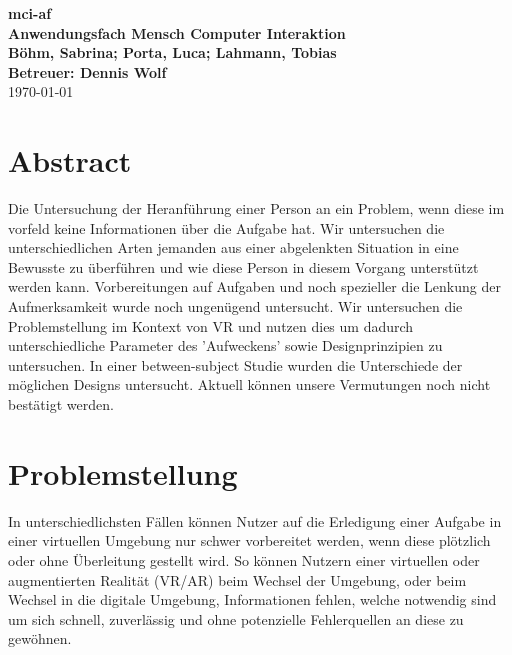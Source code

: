 \documentclass[a4paper, 11pt]{article}
\newcommand{\projectName}{mci-af}
\begin{document}
\begin{center}
	\textbf{\LARGE{\projectName}}\\
    \textbf{\large{Anwendungsfach Mensch Computer Interaktion}}\\
	\vspace{7mm}
    \textbf{\large{Böhm, \textbf{Sabrina}; Porta, Luca; Lahmann, Tobias}}\\
	\textbf{\large{Betreuer: Dennis Wolf}}\\
	\today
\end{center}

\section*{Abstract}
Die Untersuchung der Heranführung einer Person an ein Problem, wenn diese im vorfeld keine Informationen über die Aufgabe hat. %
Wir untersuchen die unterschiedlichen Arten jemanden aus einer abgelenkten Situation in eine Bewusste zu überführen und wie diese Person in diesem Vorgang unterstützt werden kann. %
Vorbereitungen auf Aufgaben und noch spezieller die Lenkung der Aufmerksamkeit wurde noch ungenügend untersucht. %
Wir untersuchen die Problemstellung im Kontext von VR und nutzen dies um dadurch unterschiedliche Parameter des 'Aufweckens' sowie Designprinzipien zu untersuchen. %
In einer between-subject Studie wurden die Unterschiede der möglichen Designs untersucht. %
Aktuell können unsere Vermutungen noch nicht bestätigt werden. %

\section*{Problemstellung}
In unterschiedlichsten Fällen können Nutzer auf die Erledigung einer Aufgabe in einer virtuellen Umgebung nur schwer vorbereitet werden, wenn diese  plötzlich oder ohne Überleitung gestellt wird. So können Nutzern einer virtuellen oder augmentierten Realität (VR/AR) beim Wechsel der Umgebung, oder beim Wechsel in die digitale Umgebung, Informationen fehlen, welche notwendig sind um sich schnell, zuverlässig und ohne potenzielle Fehlerquellen an diese zu gewöhnen. 
\end{document}
